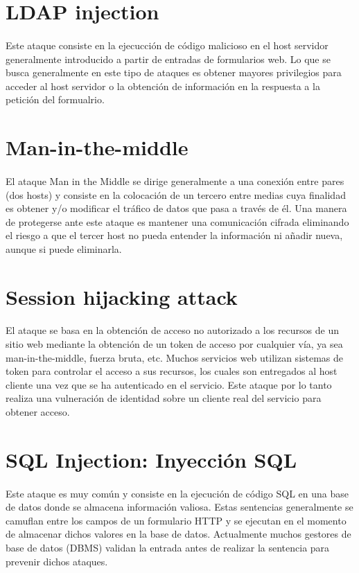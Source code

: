 \documentclass[10pt, a4paper,spanish]{article}
\begin{document}
    \section{LDAP injection}
        \paragraph{}
		Este ataque consiste en la ejecucción de código malicioso en el host servidor generalmente introducido a partir de entradas de formularios web. Lo que se busca generalmente en este tipo de ataques es obtener mayores privilegios para acceder al host servidor o la obtención de información en la respuesta a la petición del formualrio.


    \section{Man-in-the-middle}
        \paragraph{}
		El ataque Man in the Middle se dirige generalmente a una conexión entre pares (dos hosts) y consiste en la colocación de un tercero entre medias cuya finalidad es obtener y/o modificar el tráfico de datos que pasa a través de él. Una manera de protegerse ante este ataque es mantener una comunicación cifrada eliminando el riesgo a que el tercer host no pueda entender la información ni añadir nueva, aunque si puede eliminarla.


    \section{Session hijacking attack}
        \paragraph{}
		El ataque se basa en la obtención de acceso no autorizado a los recursos de un sitio web mediante la obtención de un token de acceso por cualquier vía, ya sea man-in-the-middle, fuerza bruta, etc. Muchos servicios web utilizan sistemas de token para controlar el acceso a sus recursos, los cuales son entregados al host cliente una vez que se ha autenticado en el servicio. Este ataque por lo tanto realiza una vulneración de identidad sobre un cliente real del servicio para obtener acceso.


    \section{SQL Injection: Inyección SQL}
        \paragraph{}
		Este ataque es muy común y consiste en la ejecución de código SQL en una base de datos donde se almacena información valiosa. Estas sentencias generalmente se camuflan entre los campos de un formulario HTTP y se ejecutan en el momento de almacenar dichos valores en la base de datos. Actualmente muchos gestores de base de datos (DBMS) validan la entrada antes de realizar la sentencia para prevenir dichos ataques.
\end{document}
